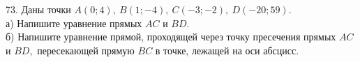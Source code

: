73. Даны точки $A(0;4),\ B(1;-4),\ C(-3;-2),\ D(-20;59).$\\
а) Напишите уравнение прямых $AC$ и $BD.$\\
б) Напишите уравнение прямой, проходящей через точку пресечения прямых $AC$ и $BD,$ пересекающей прямую $BC$ в точке, лежащей на оси абсцисс.\\
